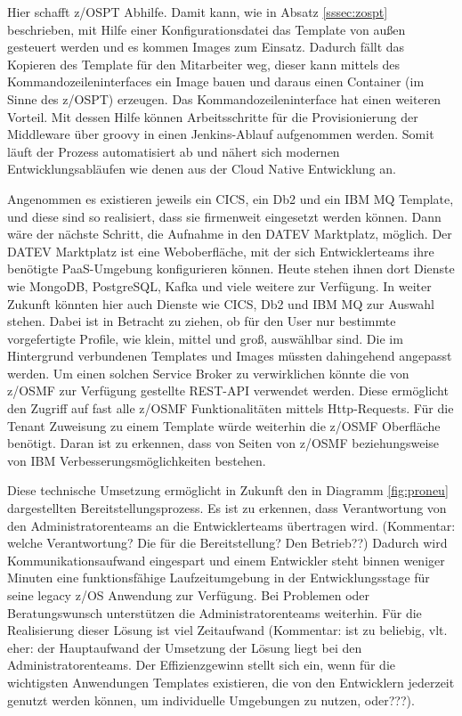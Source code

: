 Hier schafft z/OSPT Abhilfe.
Damit kann, wie in Absatz \ref{sssec:zospt} beschrieben, mit Hilfe einer Konfigurationsdatei das Template von außen gesteuert werden und es kommen Images zum Einsatz.
Dadurch fällt das Kopieren des Template für den Mitarbeiter weg, dieser kann mittels des Kommandozeileninterfaces ein Image bauen und daraus einen Container (im Sinne des z/OSPT) erzeugen.
Das Kommandozeileninterface hat einen weiteren Vorteil.
Mit dessen Hilfe können Arbeitsschritte für die Provisionierung der Middleware über groovy in einen Jenkins-Ablauf aufgenommen werden.
Somit läuft der Prozess automatisiert ab und nähert sich modernen Entwicklungsabläufen wie denen aus der Cloud Native Entwicklung an.

Angenommen es existieren jeweils ein CICS, ein Db2 und ein IBM MQ Template, und diese sind so realisiert, dass sie firmenweit eingesetzt werden können.
Dann wäre der nächste Schritt, die Aufnahme in den \glqq DATEV Marktplatz\grqq, möglich.
Der \glqq DATEV Marktplatz\grqq{} ist eine Weboberfläche, mit der sich Entwicklerteams ihre benötigte PaaS-Umgebung konfigurieren können.
Heute stehen ihnen dort Dienste wie MongoDB, PostgreSQL, Kafka und viele weitere zur Verfügung.
In weiter Zukunft könnten hier auch Dienste wie CICS, Db2 und IBM MQ zur Auswahl stehen.
Dabei ist in Betracht zu ziehen, ob für den User nur bestimmte vorgefertigte Profile, wie \glqq klein\grqq, \glqq mittel\grqq{} und \glqq groß\grqq, auswählbar sind.
Die im Hintergrund verbundenen Templates und Images müssten dahingehend angepasst werden.
Um einen solchen \glqq Service Broker\grqq{} zu verwirklichen könnte die von z/OSMF zur Verfügung gestellte REST-API verwendet werden.
Diese ermöglicht den Zugriff auf fast alle z/OSMF Funktionalitäten mittels Http-Requests.
Für die \glqq Tenant\grqq{} Zuweisung zu einem Template würde weiterhin die z/OSMF Oberfläche benötigt.
Daran ist zu erkennen, dass von Seiten von z/OSMF beziehungsweise von IBM Verbesserungsmöglichkeiten bestehen.

Diese technische Umsetzung ermöglicht in Zukunft den in Diagramm \ref{fig:proneu} dargestellten Bereitstellungsprozess.
Es ist zu erkennen, dass Verantwortung von den Administratorenteams an die Entwicklerteams übertragen wird. (Kommentar: welche Verantwortung? Die für die Bereitstellung? Den Betrieb??)
Dadurch wird Kommunikationsaufwand eingespart und einem Entwickler steht binnen weniger Minuten eine funktionsfähige Laufzeitumgebung in der Entwicklungsstage für seine legacy z/OS Anwendung zur Verfügung.
Bei Problemen oder Beratungswunsch unterstützen die Administratorenteams weiterhin.
Für die Realisierung dieser Lösung ist viel Zeitaufwand (Kommentar: ist zu beliebig, vlt. eher: der Hauptaufwand der Umsetzung der Lösung liegt bei den Administratorenteams. Der Effizienzgewinn stellt sich ein, wenn für die wichtigsten Anwendungen Templates existieren, die von den Entwicklern jederzeit genutzt werden können, um individuelle Umgebungen zu nutzen, oder???).

